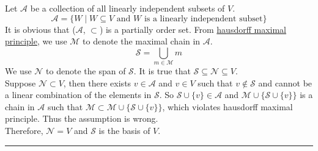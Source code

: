 \documentclass[12pt]{article}
\numberwithin{equation}{section}
\theoremstyle{plain} %
\theoremstyle{definition}
\theoremstyle{remark}
\newenvironment{proof}{{\bf Proof:}}{\hfill\rule{2mm}{2mm}}
\begin{document}
\begin{proof}
Let $\mathcal{A}$ be a collection of all linearly independent subsets of $V$.
$$\mathcal{A} = \{W \mid W \subseteq V\text{ and }W\text{ is a linearly independent subset}\}$$ 
It is obvious that ($\mathcal{A}$, $\subset$) is a partially order set. From \hyperref[statement:Hausdorff maximal principle]{hausdorff maximal principle}, we use $\mathcal{M}$ to denote the maximal chain in $\mathcal{A}$. 
$$\mathcal{S} = \bigcup_{m \in \mathcal{M}}m$$
We use $\mathcal{N}$ to denote the span of $\mathcal{S}$. It is true that $\mathcal{S} \subseteq \mathcal{N} \subseteq V$.  \\
Suppose $\mathcal{N} \subset V$, then there exists $v \in \mathcal{A}$ and $v \in V$ such that $v \notin \mathcal{S}$ and cannot be a linear combination of the elements in $\mathcal{S}$. So $\mathcal{S} \cup \{v\} \in \mathcal{A}$ and $\mathcal{M} \cup \{ \mathcal{S} \cup \{v\}\}$ is a chain in $\mathcal{A}$ such that $\mathcal{M} \subset \mathcal{M} \cup \{ \mathcal{S} \cup \{v\}\}$, which violates hausdorff maximal principle. Thus the assumption is wrong. \\
Therefore, $\mathcal{N} = V$ and $\mathcal{S}$ is the basis of $V$. 
\end{proof}


%  	
%
%


\end{document}
